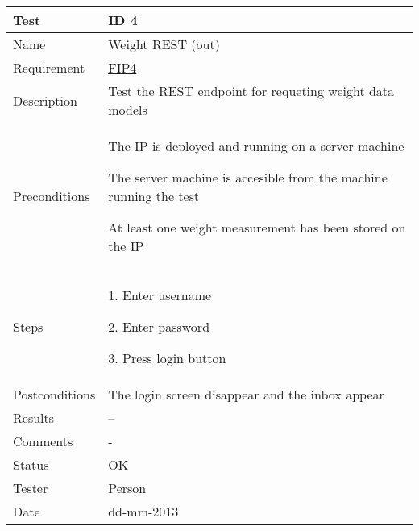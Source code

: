 \begin{table}
\begin{center}
\begin{tabular}{ | l | p{10cm} | }
	\hline
	\textbf{Test}	&	\textbf{ID 4} \\
	\hline\noalign{\smallskip}\noalign{\smallskip}\hline
	Name				& Weight REST (out) \\
	Requirement			& \hyperref[table:reqip]{FIP4} \\
	Description			& Test the REST endpoint for requeting weight data models \\
	Preconditions		&	\par The IP is deployed and running on a server machine
							\par The server machine is accesible from the machine running the test
							\par At least one weight measurement has been stored on the IP \\
	Steps 				&	\par 1. Enter username
							\par 2. Enter password
							\par 3. Press login button \\
	Postconditions		& The login screen disappear and the inbox appear \\
	Results				& -- \\
	Comments			& - \\
	Status				& OK \\
	Tester				& Person \\
	Date				& dd-mm-2013 \\
	\hline
\end{tabular}
\end{center}
\end{table}


